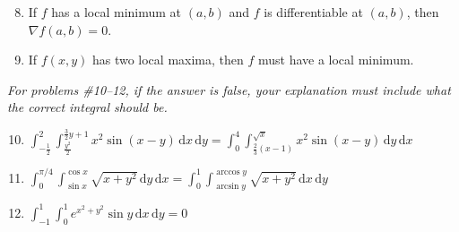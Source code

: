 \documentclass[11pt]{article}
\begin{document}
\begin{enumerate}
  \setcounter{enumi}{7}

\item If \(f\) has a local minimum at \((a,b)\) and \(f\) is differentiable at
  \((a,b)\), then \(\nabla f (a,b) = 0\).

\item If \( f(x,y) \) has two local maxima, then \( f \) must have a local minimum.
\end{enumerate}

\textit{For problems \#10--12, if the answer is false, your explanation must include what the correct integral should be.}

\begin{enumerate}
  \setcounter{enumi}{9}
  
\item
  \(\int_{-\frac{1}{2}}^{2} \int_{\frac{y^2}{2}}^{\frac{3}{2}y+1} x^2 \sin(x-y)
  \,\mathrm{d}x\,\mathrm{d}y= \int_0^4 \int_{\frac{2}{3}(x-1)}^{\sqrt{x}} x^2
  \sin(x-y) \, \mathrm{d}y \, \mathrm{d}x\)

\item
  \(\int_0^{\pi/4} \int_{\sin x}^{\cos x} \sqrt{x + y^2} \, \mathrm{d}y\,
  \mathrm{d}x= \int_0^1 \int_{\arcsin y}^{\arccos y} \sqrt{x + y^2} \,
  \mathrm{d}x\, \mathrm{d}y\)

\item
  \(\int_{-1}^{1} \int_{0}^{1} e^{x^2 + y^2} \sin y \, \mathrm{d}x\,
  \mathrm{d}y= 0\)
\end{enumerate}
\end{document}
